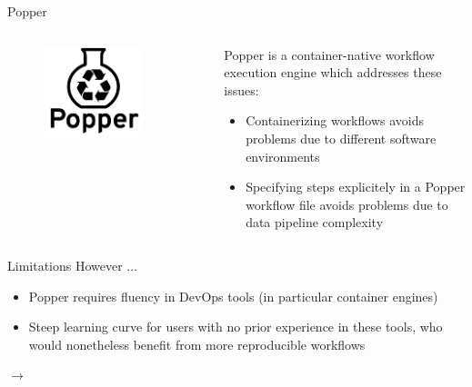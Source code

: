 \documentclass[10pt]{beamer}
\begin{document}
\begin{frame}{Popper}
    \begin{columns}
        \begin{column}{0.5\textwidth}  %
            \begin{center}
                \begin{figure}
                    \includegraphics[width=0.8\textwidth]{images/popper_logo.png}
                \end{figure}
            \end{center}
        \end{column}
        \begin{column}{0.5\textwidth}
            Popper is a container-native workflow execution engine
            which addresses these issues:
            \begin{itemize}
                \item Containerizing workflows avoids problems due to different 
                software environments
                \item Specifying steps explicitely in a Popper workflow file avoids problems due to data pipeline complexity
            \end{itemize}
        \end{column}
    \end{columns}

\end{frame}

\begin{frame}{Limitations}
    However $\ldots$
    \begin{itemize}
        \item  Popper requires fluency in DevOps tools (in particular
        container engines)
        \item Steep learning curve for users with no prior experience in these tools, who would nonetheless benefit from more reproducible workflows
    \end{itemize}
    $\rightarrow$ 
\end{frame}
\end{document}
